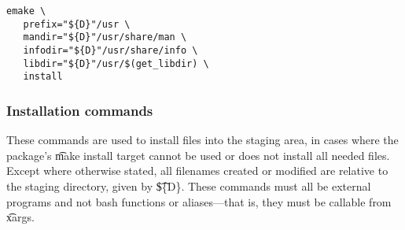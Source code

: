\begin{description}
\begin{lstlisting}[caption=einstall command,label=lst:einstall]
emake \
   prefix="${D}"/usr \
   mandir="${D}"/usr/share/man \
   infodir="${D}"/usr/share/info \
   libdir="${D}"/usr/$(get_libdir) \
   install
\end{lstlisting}

\end{description}

\subsubsection{Installation commands}
These commands are used to install files into the staging area, in cases where the package's \t{make
install} target cannot be used or does not install all needed files. Except where otherwise stated,
all filenames created or modified are relative to the staging directory, given by \t{\$\{D\}}. These
commands must all be external programs and not bash functions or aliases---that is, they must be
callable from \t{xargs}.

